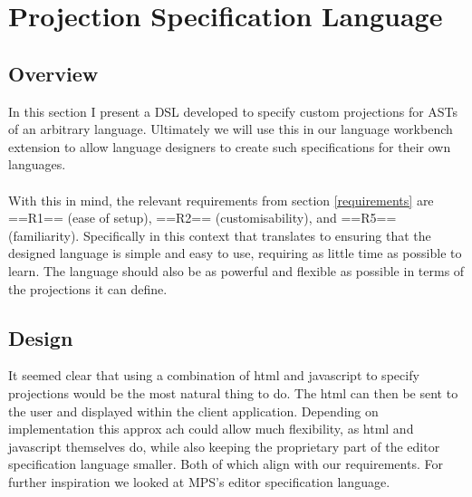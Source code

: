\documentclass{article}
\begin{document}
\section{Projection Specification Language}\label{EditorLanguage}
\subsection{Overview}
In this section I present a DSL developed to specify custom projections for ASTs of an arbitrary language. Ultimately we will use this in our language workbench extension to allow language designers to create such specifications for their own languages.
\\
\\
With this in mind, the relevant requirements from section \ref{requirements} are ==R1== (ease of setup), ==R2== (customisability), and ==R5== (familiarity). Specifically in this context that translates to ensuring that the designed language is simple and easy to use, requiring as little time as possible to learn. The language should also be as powerful and flexible as possible in terms of the projections it can define.

\subsection{Design}

It seemed clear that using a combination of html and javascript to specify projections would be the most natural thing to do. The html can then be sent to the user and displayed within the client application. Depending on implementation this approx	ach could allow much flexibility, as html and javascript themselves do, while also keeping the proprietary part of the editor specification language smaller. Both of which align with our requirements. For further inspiration we looked at MPS's editor specification language.
\end{document}
